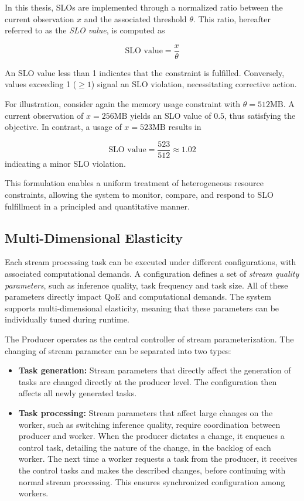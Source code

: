 In this thesis, SLOs are implemented through a normalized ratio between the current observation $x$ and the associated threshold $\theta$. This ratio, hereafter referred to as the \textit{SLO value}, is computed as

\[
\text{SLO value} = \frac{x}{\theta}
\]

An SLO value less than 1 indicates that the constraint is fulfilled. Conversely, values exceeding 1 
(\(\geq1\)) signal an SLO violation, necessitating corrective action.

For illustration, consider again the memory usage constraint with \(\theta = 512\text{MB}\). A current observation of \(x = 256\text{MB}\) yields an SLO value of \(0.5\), thus satisfying the objective. In contrast, a usage of \(x = 523\text{MB}\) results in

\[
\text{SLO value} = \frac{523}{512} \approx 1.02
\]
indicating a minor SLO violation.

This formulation enables a uniform treatment of heterogeneous resource constraints, allowing the system to monitor, compare, and respond to SLO fulfillment in a principled and quantitative manner.

\subsection{Multi-Dimensional Elasticity}
Each stream processing task can be executed under different configurations, with associated computational demands. A configuration defines a set of \textit{stream quality parameters}, such as inference quality, task frequency and task size. All of these parameters directly impact QoE and computational demands. The system supports multi-dimensional elasticity, meaning that these parameters can be individually tuned during runtime.

The Producer operates as the central controller of stream parameterization. The changing of stream parameter can be separated into two types:

\begin{itemize}
    \item \textbf{Task generation:} Stream parameters that directly affect the generation of tasks are changed directly at the producer level. The configuration then affects all newly generated tasks.
    \item \textbf{Task processing:} Stream parameters that affect large changes on the worker, such as switching inference quality, require coordination between producer and worker. When the producer dictates a change, it enqueues a control task, detailing the nature of the change, in the backlog of each worker. The next time a worker requests a task from the producer, it receives the control tasks and makes the described changes, before continuing with normal stream processing. This ensures synchronized configuration among workers.
\end{itemize}



